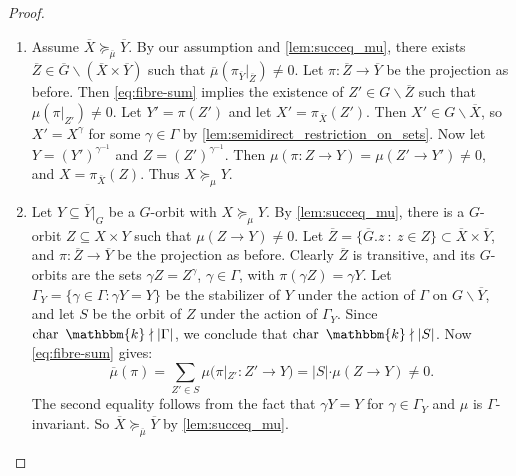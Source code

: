 \documentclass[11pt,a4paper]{amsart}
\theoremstyle{plain}%
\theoremstyle{definition}
\theoremstyle{remark}
\newcommand{\kk}{\mathbbm{k}}
\newcommand{\oG}{{\overline{G}}}
\newcommand{\oX}{{\overline{X}}}
\begin{document}
\begin{proof}
  \begin{enumerate}[itemindent=0pt,leftmargin=*]
    \item[$(\Longrightarrow)$] Assume $\oX\succeq_{\overline{\mu}}\overline{Y}$. By our assumption and \cref{lem:succeq_mu}, there exists $\overline{Z}\in \overline{G}\backslash( \oX\times \overline{Y})$ such that $\overline{\mu}(\pi_{\overline{Y}}\rvert_{\overline{Z}})\neq 0$. Let $\pi: \overline{Z}\to \overline{Y}$ be the projection as before. Then \eqref{eq:fibre-sum} implies the existence of $Z' \in G\backslash\overline{Z} $ such that $\mu(\pi|_{Z'})\neq 0$. Let $Y'=\pi(Z')$ and let $X'=\pi_{\oX}(Z')$. Then $X'\in G\backslash\oX$, so $X'=X^{\gamma}$ for some $\gamma\in \Gamma$ by \cref{lem:semidirect_restriction_on_sets}. Now let $Y=(Y')^{\gamma^{-1}}$ and $Z=(Z')^{\gamma^{-1}}$. Then $\mu(\pi: Z\to Y)=\mu(Z'\to Y')\neq 0$, and $X=\pi_{\oX}(Z)$. Thus $ X\succeq_{\mu} Y  $.
      \item[$(\Longleftarrow)$] Let $Y\subseteq\overline Y|_G$ be a $G$-orbit with $X\succeq_\mu Y$. By \cref{lem:succeq_mu}, there is a $G$-orbit $Z\subseteq X\times Y$ such that $\mu(Z\to Y)\neq 0$. Let $\overline{Z}=\{\oG.z~:~z\in Z\}\subset \oX\times \overline{Y}$, and $\pi: \overline{Z}\to \overline{Y}$ be the projection as before. Clearly $\overline{Z}$ is transitive, and its $G$-orbits are the sets $\gamma Z=Z^\gamma $, $\gamma\in\Gamma$, with $\pi( \gamma Z)= \gamma Y$. Let $\Gamma_{Y}=\{\gamma\in\Gamma:\gamma Y =Y\}$ be the stabilizer of $Y$ under the action of $\Gamma$ on $G\backslash\overline{Y}$, and let $S$ be the orbit of $Z$ under the action of $\Gamma_{Y}$. Since $\operatorname{char}~\kk\nmid|\Gamma|$, we conclude that $\operatorname{char}~\kk\nmid|S|$. Now \eqref{eq:fibre-sum} gives:
      $$ \overline{\mu}(\pi) =  \sum_{Z'\in S}\mu\bigl(\pi|_{Z'}:Z'\to Y\bigr)=|S|\cdot \mu(Z\to Y)\neq 0.$$
      The second equality follows from the fact that $\gamma Y=Y$ for $\gamma\in \Gamma_Y$ and $\mu$ is $\Gamma$-invariant. So $\oX\succeq_{\overline\mu}\overline Y$ by \cref{lem:succeq_mu}.

    \end{enumerate}

\end{proof}
   
\end{document}
